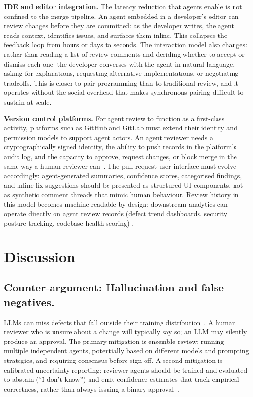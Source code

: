 \documentclass[10pt,conference]{IEEEtran}
\begin{document}
\textbf{IDE and editor integration.}
The latency reduction that agents enable is not confined to the merge pipeline.
An agent embedded in a developer's editor can review changes before they are committed: as the developer writes, the agent reads context, identifies issues, and surfaces them inline.
This collapses the feedback loop from hours or days to seconds.
The interaction model also changes: rather than reading a list of review comments and deciding whether to accept or dismiss each one, the developer converses with the agent in natural language, asking for explanations, requesting alternative implementations, or negotiating tradeoffs.
This is closer to pair programming than to traditional review, and it operates without the social overhead that makes synchronous pairing difficult to sustain at scale.

\textbf{Version control platforms.}
For agent review to function as a first-class activity, platforms such as GitHub and GitLab must extend their identity and permission models to support agent actors.
An agent reviewer needs a cryptographically signed identity, the ability to push records in the platform's audit log, and the capacity to approve, request changes, or block merge in the same way a human reviewer can~\cite{github2024copilotworkspace}.
The pull-request user interface must evolve accordingly: agent-generated summaries, confidence scores, categorised findings, and inline fix suggestions should be presented as structured UI components, not as synthetic comment threads that mimic human behaviour.
Review history in this model becomes machine-readable by design: downstream analytics can operate directly on agent review records (defect trend dashboards, security posture tracking, codebase health scoring) .



\section{Discussion}
\label{sec:discussion}


\subsection{Counter-argument: Hallucination and false negatives.}
LLMs can miss defects that fall outside their training distribution~\cite{khoury2023secure}.
A human reviewer who is unsure about a change will typically say so; an LLM may silently produce an approval.
The primary mitigation is ensemble review: running multiple independent agents, potentially based on different models and prompting strategies, and requiring consensus before sign-off.
A second mitigation is calibrated uncertainty reporting: reviewer agents should be trained and evaluated to abstain (``I don't know'') and emit confidence estimates that track empirical correctness, rather than always issuing a binary approval~\cite{kadavath2022know}.
\end{document}
